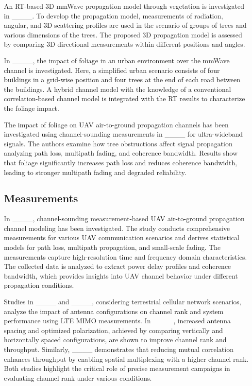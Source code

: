 An RT-based 3D mmWave propagation model through vegetation is investigated in ____. To develop the propagation model, measurements of radiation, angular, and 3D scattering profiles are used in the scenario of groups of trees and various dimensions of the trees. The proposed 3D propagation model is assessed by comparing 3D directional measurements within different positions and angles.  

In ____, the impact of foliage in an urban environment over the mmWave channel is investigated. Here, a simplified urban scenario consists of four buildings in a grid-wise position and four trees at the end of each road between the buildings. A hybrid channel model with the knowledge of a conventional correlation-based channel model is integrated with the RT results to characterize the foliage impact.

The impact of foliage on UAV air-to-ground propagation channels has been investigated using channel-sounding measurements in ____ for ultra-wideband signals. The authors examine how tree obstructions affect signal propagation analyzing path loss, multipath fading, and coherence bandwidth. Results show that foliage significantly increases path loss and reduces coherence bandwidth, leading to stronger multipath fading and degraded reliability.

\subsection{Measurements}
In ____, channel-sounding measurement-based UAV air-to-ground propagation channel modeling has been investigated. The study conducts comprehensive measurements for various UAV communication scenarios and derives statistical models for path loss, multipath propagation, and small-scale fading. The measurements capture high-resolution time and frequency domain characteristics. The collected data is analyzed to extract power delay profiles and coherence bandwidth, which provides insights into UAV channel behavior under different propagation conditions.


Studies in ____ and ____, considering terrestrial cellular network scenarios, analyze the impact of antenna configurations on channel rank and system performance using LTE MIMO measurements. In ____, increased antenna spacing and optimized polarization, achieved by comparing vertically and horizontally spaced configurations, are shown to improve channel rank and throughput. Similarly, ____ demonstrates that reducing mutual correlation enhances throughput by enabling spatial multiplexing with a higher channel rank. Both studies highlight the critical role of precise measurement campaigns in evaluating channel rank under various conditions.


